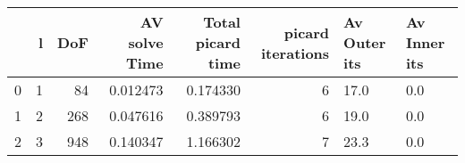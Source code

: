 \begin{tabular}{lrrrrrll}
\toprule
{} &  l &  DoF &  AV solve Time &  Total picard time &  picard iterations & Av Outer its & Av Inner its \\
\midrule
0 &  1 &   84 &       0.012473 &           0.174330 &                  6 &         17.0 &          0.0 \\
1 &  2 &  268 &       0.047616 &           0.389793 &                  6 &         19.0 &          0.0 \\
2 &  3 &  948 &       0.140347 &           1.166302 &                  7 &         23.3 &          0.0 \\
\bottomrule
\end{tabular}
